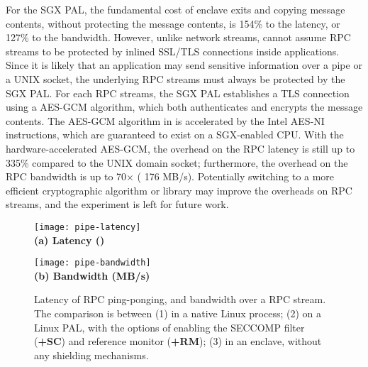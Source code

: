 For the SGX PAL,
the fundamental cost of enclave exits and copying message contents,
without protecting the message contents,
is \roughly{}154\% to the latency,
or \roughly{}127\% to the bandwidth.
However, unlike network streams, \graphenesgx{} cannot assume RPC streams to be protected by inlined SSL/TLS connections
inside applications.
Since it is likely that an application may send sensitive information
over a pipe or a UNIX socket,
the underlying RPC streams must always be protected by the SGX PAL.
For each RPC streams, the SGX PAL establishes a TLS connection using a AES-GCM algorithm, which both authenticates and encrypts the message contents.
The AES-GCM algorithm in \graphenesgx{} is accelerated by the Intel AES-NI instructions, which are guaranteed to exist on a SGX-enabled CPU.
With the hardware-accelerated AES-GCM,
the overhead on the RPC latency is still up to \roughly{}335\% compared to the UNIX domain socket;
furthermore, the overhead on the RPC bandwidth
is up to \roughly{}70$\times$ (\roughly{} 176 MB/s).
Potentially switching to a more efficient cryptographic algorithm or library may improve the overheads on RPC streams,
and the experiment is left for future work.



\begin{figure*}[t!]
\centering
\footnotesize
\begin{minipage}{.49\linewidth}
\centering
\texttt{[image: pipe-latency]}\\
{\bf (a) Latency (\usec{})}
\vspace{6pt}
\end{minipage}
\begin{minipage}{.49\linewidth}
\centering
\texttt{[image: pipe-bandwidth]}\\
{\bf (b) Bandwidth (MB/s)}
\vspace{6pt}
\end{minipage}
\caption{Latency of RPC ping-ponging, and bandwidth over a RPC stream.
The comparison is between (1) \linuxapis{} in a native Linux process; (2) \hostapis{} on a Linux PAL, with the options of enabling the SECCOMP filter ({\bf +SC}) and reference monitor ({\bf +RM}); (3) \hostapis{} in an enclave, without any shielding mechanisms.}
\label{fig:eval:pal:pipe-latency-bandwidth}
\end{figure*}


